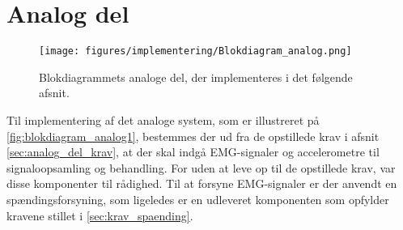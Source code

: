 \section{Analog del}
\begin{figure}[H]
\centering
\texttt{[image: figures/implementering/Blokdiagram\_analog.png]}
\caption{Blokdiagrammets analoge del, der implementeres i det følgende afsnit.}
\label{fig:blokdiagram_analog1}
\end{figure}

\noindent
Til implementering af det analoge system, som er illustreret på \autoref{fig:blokdiagram_analog1}, bestemmes der ud fra de opstillede krav i afsnit \autoref{sec:analog_del_krav}, at der skal indgå EMG-signaler og accelerometre til signaloopsamling og behandling. For uden at leve op til de opstillede krav, var disse komponenter til rådighed. Til at forsyne EMG-signaler er der anvendt en spændingsforsyning, som ligeledes er en udleveret komponenten som opfylder kravene stillet i \autoref{sec:krav_spaending}.






